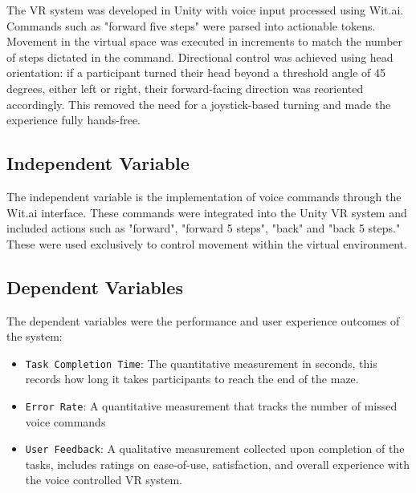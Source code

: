 \documentclass[manuscript, screen, review]{acmart}
\begin{document}
The VR system was developed in Unity with voice input processed using Wit.ai. Commands such as "forward five steps" were parsed into actionable tokens. Movement in the virtual space was executed in increments to match the number of steps dictated in the command. Directional control was achieved using head orientation: if a participant turned their head beyond a threshold angle of 45 degrees, either left or right, their forward-facing direction was reoriented accordingly. This removed the need for a joystick-based turning and made the experience fully hands-free. 



\subsection{Independent Variable}
The independent variable is the implementation of  voice commands through the Wit.ai interface. These commands were integrated into the Unity VR system and included actions such as "forward", "forward 5 steps", "back" and  "back 5 steps." These were used exclusively to control movement within the virtual environment.

\subsection{Dependent Variables}
The dependent variables were the performance and user experience outcomes of the system:
\begin{itemize}
\item {\texttt{Task Completion Time}}: The quantitative measurement in seconds, this records how long it takes participants to reach the end of the maze.
\item {\texttt{Error Rate}}: A quantitative measurement that tracks the number of missed voice commands
\item {\texttt{User Feedback}}: A qualitative measurement collected upon completion of the tasks, includes ratings on ease-of-use, satisfaction, and overall experience with the voice controlled VR system.  
\end{itemize}
\end{document}
